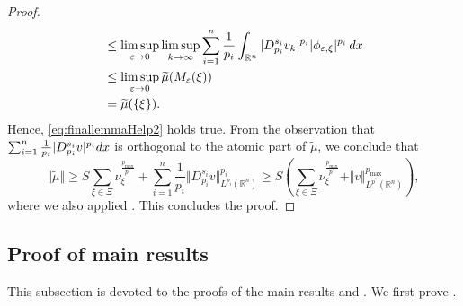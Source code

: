 \documentclass[11pt]{amsart}
\theoremstyle{plain}
\theoremstyle{definition}
\numberwithin{equation}{section}
\renewcommand{\d}{\textnormal{d}}
\newcommand{\R}{\mathbb{R}}
\newcommand{\eps}{\varepsilon}
\begin{document}
\begin{proof}
\begin{equation*}
\begin{split}
&\le \limsup_{\eps \to 0} \limsup_{k \to \infty} \sum_{i =1}^n \frac{1}{p_i} \int_{\R^n} \vert D^{s_i}_{p_i}v_k\vert^{p_i}\vert \phi_{\eps,\xi} \vert^{p_i} \, \d x\\
&\le \limsup_{\eps \to 0} \widetilde{\mu}(M_{\eps}(\xi)) \\
&=  \widetilde{\mu}(\{\xi\}).
\end{split}
\end{equation*}
Hence, \eqref{eq:finallemmaHelp2} holds true. From the observation that $\sum_{i =1}^n \frac{1}{p_i} \vert D^{s_i}_{p_i} v\vert^{p_i}\d x$ is orthogonal to the atomic part of $\widetilde{\mu}$, we conclude that
\begin{equation*}
\Vert \widetilde{\mu} \Vert \ge S \sum_{\xi \in \Xi} \nu_{\xi}^{\frac{p_{\max}}{p^{\ast}}} + \sum_{i =1}^n \frac{1}{p_i} \Vert D_{p_i}^{s_i}v\Vert_{L^{p_i}(\R^n)}^{p_i} \ge S \left(\sum_{\xi \in \Xi} \nu_{\xi}^{\frac{p_{\max}}{p^{\ast}}} + \Vert v \Vert_{L^{p^{\ast}}(\R^n)}^{p_{\max}} \right),
\end{equation*}
where we also applied . This concludes the proof.
\end{proof}





\subsection{Proof of main results}\label{ssec:main}

This subsection is devoted to the proofs of the main results  and . We first prove .
\end{document}

